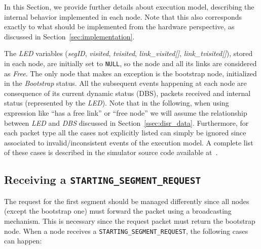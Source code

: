 In this Section, we provide further details about \disr{}
execution model, describing the internal behavior implemented in
each node. Note that this also corresponds exactly to what should be
implemented from the hardware perspective, as discussed in
Section~\ref{sec:implementation}.

The \emph{LED} variables 
(\emph{segID}, \emph{visited}, \emph{tvisited}, \emph{link\_visited[]}, \emph{link\_tvisited[]}),
stored in each node, are initially set to \texttt{NULL}, so the node and all its links
are considered as \emph{Free}.
The only node that makes an exception is the bootstrap node, initialized
in the \emph{Bootstrap} status. All the subsequent events happening at
each node are consequence of its current dynamic status (DBS), 
packets received and internal status (represented by the
\emph{LED}). Note that in the following, when using expression like
``has a free link'' or ``free node'' we will assume the relationship between 
\emph{LED} and \emph{DBS} discussed in Section~\ref{ssec:disr_data}. Furthermore, for
each packet type all the cases not explicitly listed can simply be
ignored since associated to invalid/inconsistent events of the
\disr{} execution model. A complete list of these cases is 
described in the simulator source code available at~\cite{nanoxim}.

\subsection{Receiving a \texttt{STARTING\_SEGMENT\_REQUEST}}
The request for the first segment should be managed differently since
all nodes (except the bootstrap one) must forward the packet using a
broadcasting mechanism. This is necessary since the request packet must
return the bootstrap node.
When a node receives a \texttt{STARTING\_SEGMENT\_REQUEST}, the
following cases can happen:

